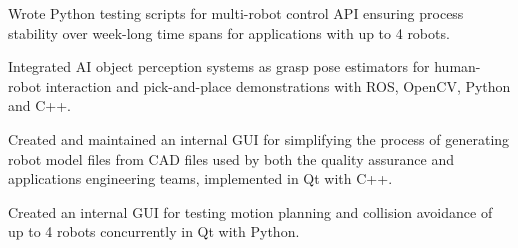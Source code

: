 \begin{cventries}
{\begin{cvitems}
        \item{Wrote Python testing scripts for multi-robot control API ensuring process stability over week-long time spans for applications with up to 4 robots.}
        \item{Integrated AI object perception systems as grasp pose estimators for human-robot interaction and pick-and-place demonstrations with ROS, OpenCV, Python and C++.}
        \item{Created and maintained an internal GUI for simplifying the process of generating robot model files from CAD files used by both the quality assurance and applications engineering teams, implemented in Qt with C++.}
        \item{Created an internal GUI for testing motion planning and collision avoidance of up to 4 robots concurrently in Qt with Python.}
    \end{cvitems}
    }
\end{cventries}
